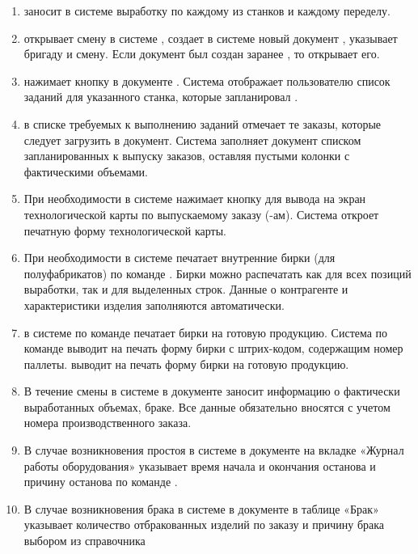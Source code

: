 \begin{enumerate}
\item	\operator заносит в системе \gofro выработку по каждому из станков и каждому переделу.
\item	\operator открывает смену в системе \gofro, создает в системе \gofro новый документ , указывает  бригаду и смену. Если документ был создан заранее \planner, то открывает его.
\item	\operator нажимает кнопку  в документе . Система \gofro отображает пользователю список заданий для указанного станка, которые запланировал \planner. 
\item	\operator в списке требуемых к выполнению заданий отмечает те заказы, которые следует загрузить в документ. Система \gofro заполняет документ списком запланированных к выпуску заказов, оставляя пустыми колонки с фактическими объемами.
\item	При необходимости \operator в системе \gofro  нажимает кнопку  для вывода на экран технологической карты по выпускаемому заказу (-ам). Система \gofro откроет печатную форму технологической карты.
\item При необходимости \operator в системе \gofro печатает внутренние бирки (для полуфабрикатов) по команде . Бирки можно распечатать как для всех позиций выработки, так и для выделенных строк. Данные о контрагенте и характеристики изделия заполняются автоматически.
\item	\operator в системе \gofro по команде  печатает бирки на готовую продукцию. 
Система \gofro по команде  
\ifnum{}
   выводит на печать форму бирки с штрих-кодом, 
   содержащим
   номер паллеты.
\else
   выводит на печать форму бирки на готовую продукцию. 
\fi
\item	В течение смены \operator в системе \gofro в документе   заносит информацию о фактически выработанных объемах, браке. Все данные обязательно вносятся с учетом номера производственного заказа.
\item	В случае возникновения простоя \operator  в системе \gofro в документе  на вкладке «Журнал работы оборудования» указывает время начала и окончания останова и причину останова по команде .
\item	В случае возникновения брака \operator  в системе \gofro в документе   в таблице «Брак» указывает количество отбракованных изделий по заказу и причину брака выбором из справочника

\end{enumerate}
